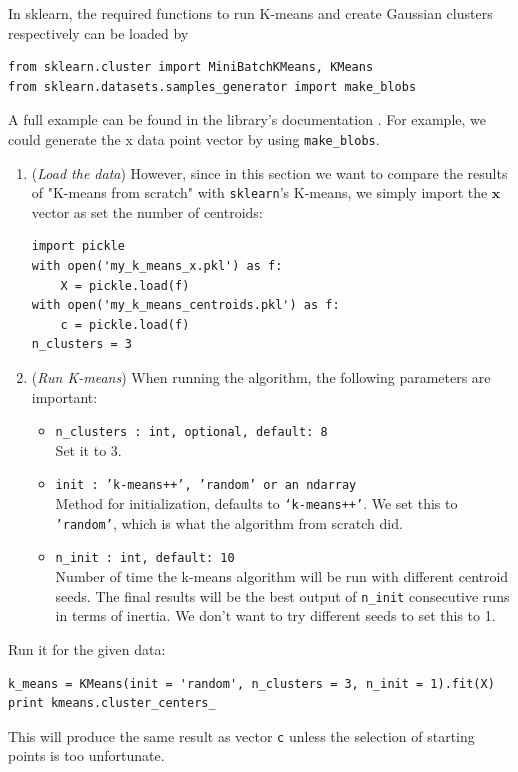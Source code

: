 \documentclass[a4paper]{article}
\begin{document}
In sklearn, the required functions to run K-means and create Gaussian clusters respectively can be loaded by
\begin{verbatim}
from sklearn.cluster import MiniBatchKMeans, KMeans
from sklearn.datasets.samples_generator import make_blobs
\end{verbatim}
A full example can be found in the library's documentation \TODO[red]. For example, we could generate the x data point vector by using \texttt{make_blobs}. 
\begin{enumerate}
    \item (\textit{Load the data})
However, since in this section we want to compare the results of "K-means from scratch" with \texttt{sklearn}'s K-means, we simply import the $\textbf{x}$ vector as set the number of centroids:
\begin{verbatim}
import pickle
with open('my_k_means_x.pkl') as f:
    X = pickle.load(f)
with open('my_k_means_centroids.pkl') as f:
    c = pickle.load(f)
n_clusters = 3
\end{verbatim}
\item  (\textit{Run K-means}) When running the algorithm, the following parameters are important:
\begin{itemize} 
    \item \texttt{n_clusters : int, optional, default: 8}\\
    Set it to 3.
    \item \texttt{init : {'k-means++', 'random' or an ndarray}}\\
Method for initialization, defaults to \texttt{‘k-means++’}. We set this to \texttt{'random'}, which is what the algorithm from scratch did.
    \item \texttt{n_init : int, default: 10} \\
Number of time the k-means algorithm will be run with different centroid seeds. The final results will be the best output of \texttt{n_init} consecutive runs in terms of inertia. We don't want to try different seeds to set this to 1.
\end{itemize}
\end{enumerate}
Run it for the given data:
\begin{verbatim}
k_means = KMeans(init = 'random', n_clusters = 3, n_init = 1).fit(X)
print kmeans.cluster_centers_
\end{verbatim}
This will produce the same result as vector \texttt{c} unless the selection of starting points is too unfortunate.
\end{document}
